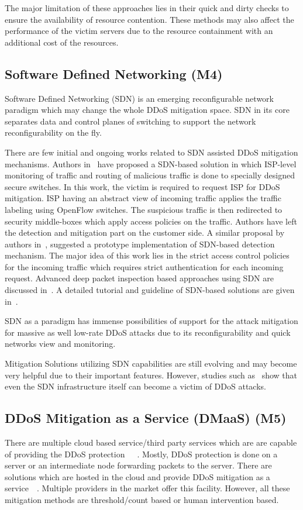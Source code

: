 \documentclass[final,5p,times,twocolumn]{elsarticle}
\begin{document}
{The major limitation of these approaches lies in their quick and dirty checks to ensure the availability of resource contention. These methods may also affect the performance of the victim servers due to the resource containment with an additional cost of the resources. }

\subsection{Software Defined Networking (M4)}
\label{SDN}
{Software Defined Networking (SDN) is an emerging reconfigurable network paradigm which may change the whole DDoS mitigation space. SDN in its core separates data and control planes of switching to support the network reconfigurability on the fly. }

There are few initial and ongoing works related to SDN assisted DDoS mitigation mechanisms. Authors in~\cite{sahay2015towards} have proposed a SDN-based solution in which ISP-level monitoring of traffic and routing of malicious traffic is done to specially designed secure switches. In this work, the victim is required to request ISP for DDoS mitigation. ISP having an abstract view of incoming traffic applies the traffic labeling using OpenFlow switches. The suspicious traffic is then redirected to security middle-boxes which apply access policies on the traffic. Authors have left the detection and mitigation part on the customer side. {A similar proposal by authors in~\cite{wang2015sdsnm}, suggested a prototype implementation of SDN-based detection mechanism. The major idea of this work lies in the strict access control policies for the incoming traffic which requires strict authentication for each incoming request. Advanced deep packet inspection based approaches using SDN are discussed in~\cite{tsai2017defending}. A detailed tutorial and guideline of SDN-based solutions are given in~\cite{cloudddosSDN}.  } 

{SDN as a paradigm has immense possibilities of support for the attack mitigation for massive as well low-rate DDoS attacks due to its reconfigurability and quick networks view and monitoring. }

{Mitigation Solutions utilizing SDN capabilities are still evolving and may become very helpful due to their important features. However, studies such as~\cite{yan2015distributed} show that even the SDN infrastructure itself can become a victim of DDoS attacks. }


\subsection{{DDoS Mitigation as a Service (DMaaS) (M5)}}
{There are multiple cloud based service/third party services which are are capable of providing the DDoS protection~\cite{prolexic}~\cite{Akamai}~\cite{arbor}. Mostly, DDoS protection is done on a server or an intermediate node forwarding packets to the server. There are solutions which are hosted in the cloud and provide DDoS mitigation as a service~\cite{DaaS1}~\cite{DaaS2}. Multiple providers in the market offer this facility. However, all these mitigation methods are threshold/count based or human intervention based. }
\end{document}
